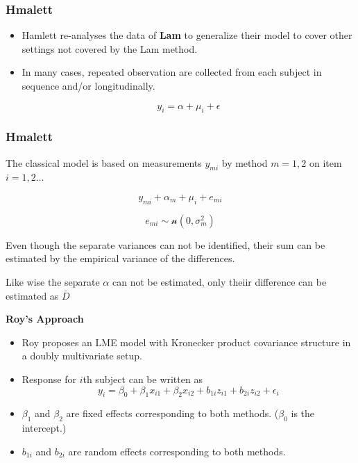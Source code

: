 \documentclass[compress]{beamer}        %
\makeatletter
\newcommand{\tcb}{\textcolor{beamer@blendedblue}}
\makeatother
\begin{document}

\begin{frame}
\frametitle{Hmalett}
\large

\begin{itemize}
\item Hamlett re-analyses the data of \textbf{Lam} to generalize their model to cover other settings not covered by the Lam method.

\item In many cases, repeated observation are collected from each subject in sequence  and/or longitudinally.


\[ y_i = \alpha + \mu_i + \epsilon \]
\end{itemize}

\end{frame}


\begin{frame}
\frametitle{Hmalett}
The classical model is based on measurements $y_{mi}$
by method $m=1,2$ on item $i = 1,2 \ldots$

\[y_{mi} + \alpha_{m} + \mu_{i} + e_{mi}\]

\[e_{mi} \sim \mathcal{n} (0,\sigma^2_m)\]

Even though the separate variances can not be
identified, their sum can be estimated by the empirical variance of the differences.

Like wise the separate $\alpha$ can not be
estimated, only theiir difference can be estimated as
$\bar{D}$

\end{frame}
\begin{frame}{\bf \tcb{Roy's Approach}}
\begin{itemize}\itemsep0.7cm
\item Roy proposes an LME model with Kronecker product covariance structure in a doubly multivariate setup.
\item Response for $i$th subject can be written as
\[ y_i = \beta_0 + \beta_1x_{i1} + \beta_2x_{i2} + b_{1i}z_{i1}  + b_{2i}z_{i2} + \epsilon_i \]
\item $\beta_1$ and $\beta_2$ are fixed effects corresponding to both methods. ($\beta_0$ is the intercept.)
\item $b_{1i}$ and $b_{2i}$ are random effects corresponding to both methods.
\end{itemize}
\end{frame}
\end{document}
